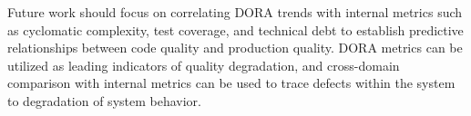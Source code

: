 \documentclass[12pt]{article}
\begin{document}
Future work should focus on correlating DORA trends with internal
metrics such as
cyclomatic complexity, test coverage, and technical debt to establish predictive
relationships between code quality and production quality. DORA
metrics can be utilized
as leading indicators of quality degradation, and cross-domain
comparison with internal metrics
can be used to trace defects within the system to degradation of
system behavior.





\end{document}
